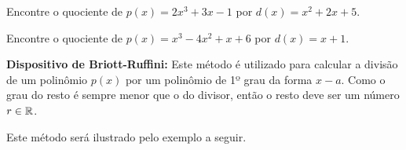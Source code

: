 \begin{exem}
    Encontre o quociente de $p(x)=2x^3 +3x-1$ por $d(x)=x^2+2x+5$.
    \begin{center}
    \end{center}
\end{exem}

\begin{exem}
    Encontre o quociente de $p(x)=x^3-4x^2+x+6$ por $d(x)=x+1$.
    \begin{center}
    \end{center}
\end{exem}


\textbf{Dispositivo de Briott-Ruffini:} Este método é utilizado para calcular a divisão de um polinômio $p(x)$ por um polinômio de 1º grau da forma $x-a$. Como o grau do resto é sempre menor que o do divisor, então o resto deve ser um número $r\in\mathbb{R}$.

Este método será ilustrado pelo exemplo a seguir.


